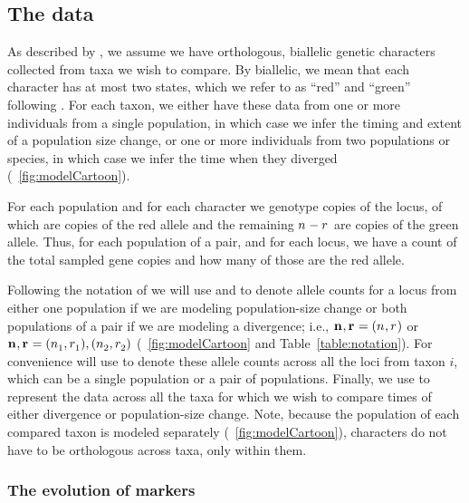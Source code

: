 \subsection{The data}
As described by \citet{Oaks2018ecoevolity},
we assume we have orthologous, biallelic genetic characters collected from
taxa we wish to compare.
By biallelic, we mean that each character has at most two states,
which we refer to as ``red'' and ``green'' following \citet{Bryant2012}.
For each taxon, we either have these data from one or more individuals from a
single population, in which case we infer the timing and extent of a population
size change, or one or more individuals from two populations or species,
in which case we infer the time when they diverged (\fig{}~\ref{fig:modelCartoon}).

For each population and for each character we genotype \allelecount copies
of the locus, \redallelecount of which are copies of the red allele and the
remaining $\allelecount - \redallelecount$ are copies of the green allele.
Thus, for each population of a pair, and for each locus, we have a count of the
total sampled gene copies and how many of those are the red allele.

\ifembed{

}{}

Following the notation of \citet{Oaks2018ecoevolity}
we will use \leafallelecounts and \leafredallelecounts to denote allele counts
for a locus from either one population if we are modeling population-size
change or both populations of a pair if we are modeling a divergence; i.e., 
$\leafallelecounts, \leafredallelecounts = (\allelecount, \redallelecount)$
or
$\leafallelecounts, \leafredallelecounts = (\allelecount[1],
\redallelecount[1]), (\allelecount[2], \redallelecount[2])$
(\fig{}~\ref{fig:modelCartoon}
and
Table~\ref{table:notation}).
For convenience will use \comparisondata[i] to denote these allele counts
across all the loci from taxon $i$, which can be a single population
or a pair of populations.
Finally, we use \alldata to represent the data across all the taxa for which we
wish to compare times of either divergence or population-size change.
Note, because the population of each compared taxon is modeled separately
(\fig{}~\ref{fig:modelCartoon}),
characters do not have to be orthologous across taxa, only within them.


\subsubsection{The evolution of markers}

